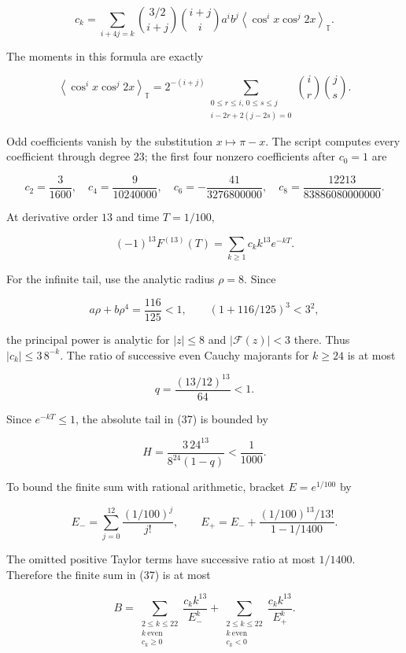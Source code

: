 \documentclass[
  11pt,
]{article}
\begin{document}
\[
\tag{36}
 c_k=\sum_{i+4j=k}
 \binom{3/2}{i+j}\binom{i+j}{i}a^ib^j
      \left\langle \cos^i x\cos^j2x\right\rangle_{\mathbb T}.
\]

The moments in this formula are exactly

\[
\left\langle \cos^i x\cos^j2x\right\rangle_{\mathbb T}
 =2^{-(i+j)}
  \sum_{\substack{0\leq r\leq i,\,0\leq s\leq j\\
           i-2r+2(j-2s)=0}}\binom ir\binom js.
\]

Odd coefficients vanish by the substitution \(x\mapsto\pi-x\). The
script computes every coefficient through degree \(23\); the first four
nonzero coefficients after \(c_0=1\) are

\[
c_2=\frac3{1600},\quad
 c_4=\frac9{10240000},\quad
 c_6=-\frac{41}{3276800000},\quad
 c_8=\frac{12213}{83886080000000}.
\]

At derivative order \(13\) and time \(T=1/100\),

\[
\tag{37}
 (-1)^{13}F^{(13)}(T)=\sum_{k\geq1}c_k k^{13}e^{-kT}.
\]

For the infinite tail, use the analytic radius \(\rho=8\). Since

\[
a\rho+b\rho^4=\frac{116}{125}<1,
 \qquad (1+116/125)^3<3^2,
\]

the principal power is analytic for \(|z|\leq8\) and
\(|\mathcal F(z)|<3\) there. Thus \(|c_k|\leq3\,8^{-k}\). The ratio of
successive even Cauchy majorants for \(k\geq24\) is at most

\[
q=\frac{(13/12)^{13}}{64}<1.
\]

Since \(e^{-kT}\leq1\), the absolute tail in (37) is bounded by

\[
\tag{38}
 H=\frac{3\,24^{13}}{8^{24}(1-q)}<\frac1{1000}.
\]

To bound the finite sum with rational arithmetic, bracket
\(E=e^{1/100}\) by

\[
E_-=\sum_{j=0}^{12}\frac{(1/100)^j}{j!},
 \qquad
 E_+=E_-+\frac{(1/100)^{13}/13!}{1-1/1400}.
\]

The omitted positive Taylor terms have successive ratio at most
\(1/1400\). Therefore the finite sum in (37) is at most

\[
B=
 \sum_{\substack{2\leq k\leq22\\ k\ \mathrm{even}\\c_k\geq0}}
       \frac{c_k k^{13}}{E_-^k}
 +
 \sum_{\substack{2\leq k\leq22\\ k\ \mathrm{even}\\c_k<0}}
       \frac{c_k k^{13}}{E_+^k}.
\]
\end{document}
